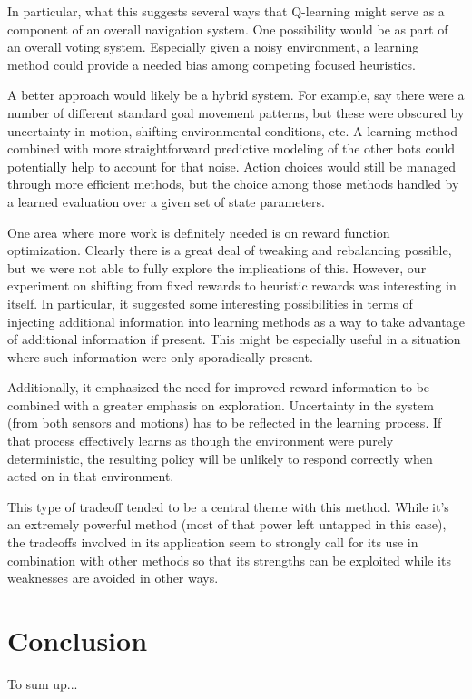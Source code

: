\documentclass{aiaa-tc}%
\begin{document}
In particular, what this suggests several ways that Q-learning might serve as a
component of an overall navigation system. One possibility would be as
part of an overall voting system. Especially given a noisy
environment, a learning method could provide a needed bias among
competing focused heuristics.

A better approach would likely be a hybrid system. For example, say
there were a number of different standard goal movement patterns, but
these were obscured by uncertainty in motion, shifting environmental
conditions, etc. A learning method combined with more straightforward
predictive modeling of the other bots could potentially help to
account for that noise. Action choices would still be managed through
more efficient methods, but the choice among those methods handled by
a learned evaluation over a given set of state parameters.

One area where more work is definitely needed is on reward function
optimization. Clearly there is a great deal of tweaking and rebalancing
possible, but we were not able to fully explore the implications of
this. However, our experiment on shifting from fixed rewards to
heuristic rewards was interesting in itself. In particular, it
suggested some interesting possibilities in terms of injecting
additional information into learning methods as a way to take
advantage of additional information if present. This might be
especially useful in a situation where such information were only
sporadically present.

Additionally, it
emphasized the need for improved reward information to be combined with a greater emphasis
on exploration. Uncertainty in the system (from both sensors and
motions) has to be reflected in the learning process. If that process
effectively learns as though the environment were purely
deterministic, the resulting policy will be unlikely to respond
correctly when acted on in that environment.

This type of tradeoff tended to be a central theme with this
method. While it's an extremely powerful method (most of that power
left untapped in this case), the tradeoffs involved in its application
seem to strongly call for its use in combination with other
methods so that its strengths can be exploited while its weaknesses
are avoided in other ways.

\section{Conclusion}
\label{Conclusion}
To sum up...
\end{document}
